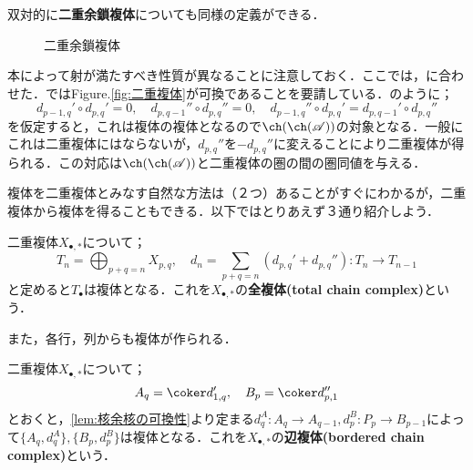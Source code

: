 双対的に\textbf{二重余鎖複体}についても同様の定義ができる．
\begin{figure}[H]
	\centering
	\caption{二重余鎖複体}
\end{figure}

本によって射が満たすべき性質が異なることに注意しておく．ここでは\cite{Kawada1976}，\cite{Shiho2016}に合わせた．\cite{Kato2003}ではFigure.\ref{fig:二重複体}が可換であることを要請している．\cite{Kato2003}のように；
\[d_{p-1,q}'\circ d_{p,q}'=0,\quad d_{p,q-1}''\circ d_{p,q}''=0,\quad d_{p-1,q}''\circ d_{p,q}'=d_{p,q-1}'\circ d_{p,q}''\]
を仮定すると，これは複体の複体となるので$\ch(\ch(\mathscr{A}))$の対象となる．一般にこれは二重複体にはならないが，$d_{p,q}''$を$-d_{p,q}''$に変えることにより二重複体が得られる．この対応は$\ch(\ch(\mathscr{A}))$と二重複体の圏の間の圏同値を与える．

複体を二重複体とみなす自然な方法は（２つ）あることがすぐにわかるが，二重複体から複体を得ることもできる．以下ではとりあえず３通り紹介しよう．

\begin{defi}[全複体]
	二重複体$X_{\bullet,\ast}$について；
	\[T_n=\bigoplus_{p+q=n} X_{p,q},\quad d_n=\sum_{p+q=n}(d_{p,q}'+d_{p,q}''):T_n\to T_{n-1}\]
	と定めると$T_\bullet$は複体となる．これを$X_{\bullet,\ast}$の\textbf{全複体(total chain complex)}という．
\end{defi}

また，各行，列からも複体が作られる．
\begin{defi}
	二重複体$X_{\bullet,\ast}$について；
	\[A_q=\coker d_{1,q}',\quad B_p=\coker d_{p,1}''\]
	とおくと，\ref{lem:核余核の可換性}より定まる$d_q^A:A_q\to A_{q-1},d_p^B:P_p\to B_{p-1}$によって$\{A_q,d_q^A\},\{B_p,d_p^B\}$は複体となる．これを$X_{\bullet,\ast}$の\textbf{辺複体(bordered chain complex)}という．
\end{defi}

